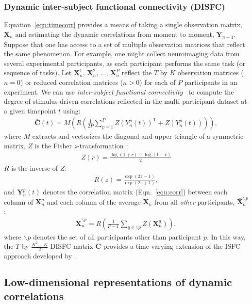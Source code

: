 \documentclass[english]{article}
\begin{document}
\subsubsection*{Dynamic inter-subject functional connectivity (DISFC)}
Equation~\ref{eqn:timecorr} provides a means of taking a single
observation matrix, $\mathbf{X}_n$ and estimating the dynamic
correlations from moment to moment, $\mathbf{Y}_{n+1}$.  Suppose that
one has access to a set of multiple observation matrices that reflect
the same phenomenon.  For example, one might collect neuroimaging data
from several experimental participants, as each participant performs
the same task (or sequence of tasks).  Let $\mathbf{X}_n^1$,
$\mathbf{X}_n^2$, ..., $\mathbf{X}_n^P$ reflect the $T$ by $K$
observation matrices ($n = 0$) or reduced correlation matrices
($n > 0$) for each of $P$ participants in an experiment.  We can use
\textit{inter-subject functional connectivity}~\citep[ISFC;
][]{SimoEtal16} to compute the degree of stimulus-driven correlations
reflected in the multi-participant dataset at a given timepoint $t$
using:
\begin{align}
\bar{\mathbf{C}}(t) = M\left(R\left(\frac{1}{2P} \sum_{p=1}^P
  Z\left(Y_n^p(t)\right)^\mathrm{T} + Z\left(Y_n^p(t)\right)\right)\right),\label{eqn:disfc}
\end{align}
where $M$ extracts and vectorizes the diagonal and upper triangle of a symmetric
matrix, $Z$ is the Fisher $z$-transformation~\citep{Zar10}:
\begin{align}
Z(r) = \frac{\log(1+r) - \log(1-r)}{2}
\end{align}
$R$ is the inverse of $Z$:
\begin{align}
R(z) = \frac{\exp(2z - 1)}{\exp(2z + 1)},
\end{align}
and $\mathbf{Y}_n^p(t)$ denotes the correlation matrix
(Eqn.~\ref{eqn:corr}) between each column of $\mathbf{X}_n^p$ and each
column of the average $\mathbf{X}_n$ from all \textit{other}
participants, $\bar{\mathbf{X}}_n^{ \backslash p}$:
\begin{align}
  \bar{\mathbf{X}}_n^{ \backslash p} = R\left(\frac{1}{P-1}\sum_{q \in
  \backslash p} Z\left( \mathbf{X}_n^q \right) \right),
\end{align}
where $\backslash p$ denotes the set of all participants other than
participant $p$. In this way, the $T$ by $\frac{K^2 - K}{2}$ DISFC
matrix $\bar{\mathbf{C}}$ provides a time-varying extension of the ISFC
approach developed by \cite{SimoEtal16}.

\subsection*{Low-dimensional representations of dynamic
  correlations}
\end{document}
